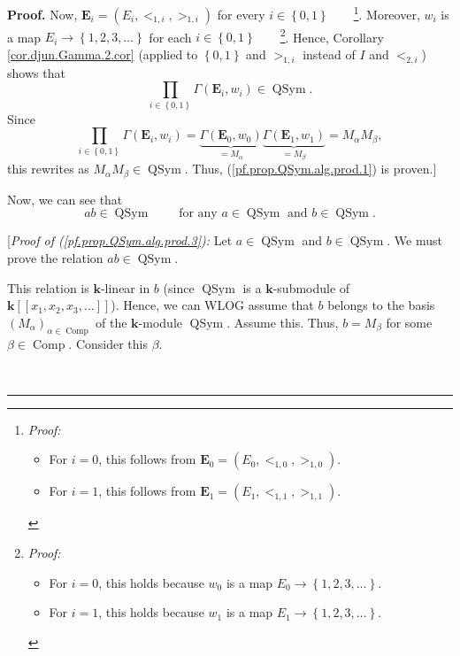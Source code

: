 \documentclass[numbers=enddot,12pt,final,onecolumn,notitlepage,abstracton]{scrartcl}
\theoremstyle{definition}
\newenvironment{proof}[1][Proof]{\noindent\textbf{#1.} }{\ \rule{0.5em}{0.5em}}
\let\prodnonlimits\prod
\renewcommand{\prod}{\prodnonlimits\limits}
\newenvironment{verlong}{}{}
\begin{document}
\begin{verlong}
\begin{footnotesize}
\begin{proof}
Now, $\mathbf{E}_{i}=\left(  E_{i},<_{1,i},>_{1,i}\right)  $ for every
$i\in\left\{  0,1\right\}  $\ \ \ \ \footnote{\textit{Proof:}
\par
\begin{itemize}
\item For $i=0$, this follows from $\mathbf{E}_{0}=\left(  E_{0}%
,<_{1,0},>_{1,0}\right)  $.
\par
\item For $i=1$, this follows from $\mathbf{E}_{1}=\left(  E_{1}%
,<_{1,1},>_{1,1}\right)  $.
\end{itemize}
}. Moreover, $w_{i}$ is a map $E_{i}\rightarrow\left\{  1,2,3,\ldots\right\}
$ for each $i\in\left\{  0,1\right\}  $\ \ \ \ \footnote{\textit{Proof:}
\par
\begin{itemize}
\item For $i=0$, this holds because $w_{0}$ is a map $E_{0}\rightarrow\left\{
1,2,3,\ldots\right\}  $.
\par
\item For $i=1$, this holds because $w_{1}$ is a map $E_{1}\rightarrow\left\{
1,2,3,\ldots\right\}  $.
\end{itemize}
}. Hence, Corollary \ref{cor.djun.Gamma.2.cor} (applied to $\left\{
0,1\right\}  $ and $>_{1,i}$ instead of $I$ and $<_{2,i}$) shows that
\[
\prod_{i\in\left\{  0,1\right\}  }\Gamma\left(  \mathbf{E}_{i},w_{i}\right)
\in\operatorname*{QSym}.
\]
Since
\[
\prod_{i\in\left\{  0,1\right\}  }\Gamma\left(  \mathbf{E}_{i},w_{i}\right)
=\underbrace{\Gamma\left(  {\mathbf{E}}_{0},w_{0}\right)  }_{=M_{\alpha}%
}\underbrace{\Gamma\left(  {\mathbf{E}}_{1},w_{1}\right)  }_{=M_{\beta}%
}=M_{\alpha}M_{\beta},
\]
this rewrites as $M_{\alpha}M_{\beta}\in\operatorname*{QSym}$. Thus,
(\ref{pf.prop.QSym.alg.prod.1}) is proven.]

Now, we can see that%
\begin{equation}
ab\in\operatorname*{QSym}\ \ \ \ \ \ \ \ \ \ \text{for any }a\in
\operatorname*{QSym}\text{ and }b\in\operatorname*{QSym}.
\label{pf.prop.QSym.alg.prod.3}%
\end{equation}


[\textit{Proof of (\ref{pf.prop.QSym.alg.prod.3}):} Let $a\in
\operatorname*{QSym}$ and $b\in\operatorname*{QSym}$. We must prove the
relation $ab\in\operatorname*{QSym}$.

This relation is $\mathbf{k}$-linear in $b$ (since $\operatorname*{QSym}$ is a
$\mathbf{k}$-submodule of $\mathbf{k}\left[  \left[  x_{1},x_{2},x_{3}%
,\ldots\right]  \right]  $). Hence, we can WLOG assume that $b$ belongs to the
basis $\left(  M_{\alpha}\right)  _{\alpha\in\operatorname*{Comp}}$ of the
$\mathbf{k}$-module $\operatorname*{QSym}$. Assume this. Thus, $b=M_{\beta}$
for some $\beta\in\operatorname*{Comp}$. Consider this $\beta$.


\end{proof}
\end{footnotesize}
\end{verlong}
\end{document}
